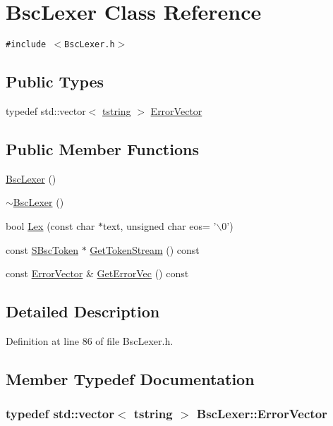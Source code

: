 \hypertarget{class_bsc_lexer}{
\section{BscLexer Class Reference}
\label{class_bsc_lexer}
}
{\tt \#include $<$BscLexer.h$>$}

\subsection*{Public Types}
\begin{CompactItemize}
\item 
typedef std::vector$<$ \hyperlink{common__afx_8h_816fa58fd77499b0edb2c69ebe803d5c}{tstring} $>$ \hyperlink{class_bsc_lexer_ddc6ff5e91607495a8b9b348d35a7e41}{ErrorVector}
\end{CompactItemize}
\subsection*{Public Member Functions}
\begin{CompactItemize}
\item 
\hyperlink{class_bsc_lexer_df8d1464bff758687744adc194451288}{BscLexer} ()
\item 
\hyperlink{class_bsc_lexer_af090a37a94febc2eb6177f320b07017}{$\sim$BscLexer} ()
\item 
bool \hyperlink{class_bsc_lexer_710aec711fc9f9e7767378d5698e3678}{Lex} (const char $\ast$text, unsigned char eos= '$\backslash$0')
\item 
const \hyperlink{struct_s_bsc_token}{SBscToken} $\ast$ \hyperlink{class_bsc_lexer_6cd18bcdd16ddc8e7f350ee1f91541c8}{GetTokenStream} () const 
\item 
const \hyperlink{class_bsc_lexer_ddc6ff5e91607495a8b9b348d35a7e41}{ErrorVector} \& \hyperlink{class_bsc_lexer_97242fc1951fd5343e1b785a89146058}{GetErrorVec} () const 
\end{CompactItemize}


\subsection{Detailed Description}


Definition at line 86 of file BscLexer.h.

\subsection{Member Typedef Documentation}
\hypertarget{class_bsc_lexer_ddc6ff5e91607495a8b9b348d35a7e41}{
\subsubsection[{ErrorVector}]{\setlength{\rightskip}{0pt plus 5cm}typedef std::vector$<$ {\bf tstring} $>$ {\bf BscLexer::ErrorVector}}}
\label{class_bsc_lexer_ddc6ff5e91607495a8b9b348d35a7e41}




